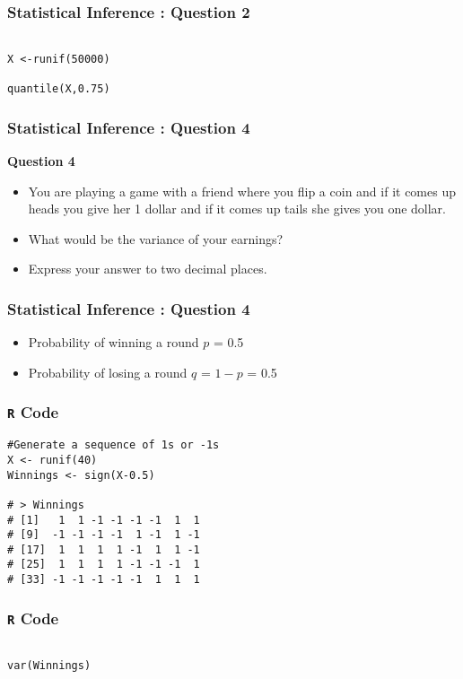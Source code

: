 \documentclass{beamer}
\begin{document}
\begin{frame}[fragile]
\frametitle{Statistical Inference : Question 2}

\begin{framed}
\begin{verbatim}

X <-runif(50000)

quantile(X,0.75)
\end{verbatim}
\end{framed}
\end{frame}
\begin{frame}
\frametitle{Statistical Inference : Question 4}
\Large
\textbf{Question 4}
\begin{itemize}
\item 
You are playing a game with a friend where you flip a coin and if it comes up heads you give her 1 dollar and 
if it comes up tails she gives you one dollar. 

\item What would be the variance of your earnings?

\item 
Express your answer to two decimal places.
\end{itemize}
\end{frame}
\begin{frame}
\frametitle{Statistical Inference : Question 4}
\Large
\vspace{-2cm}

\begin{itemize}
\item Probability of winning a round $p$ = 0.5
\bigskip
\item  Probability of losing a round $q$ = $1-p$ = 0.5


\end{itemize}
\end{frame}
\begin{frame}[fragile]
\frametitle{\texttt{R} Code}
\Large
\begin{verbatim}
#Generate a sequence of 1s or -1s
X <- runif(40)
Winnings <- sign(X-0.5)

# > Winnings
# [1]   1  1 -1 -1 -1 -1  1  1
# [9]  -1 -1 -1 -1  1 -1  1 -1
# [17]  1  1  1  1 -1  1  1 -1
# [25]  1  1  1  1 -1 -1 -1  1
# [33] -1 -1 -1 -1 -1  1  1  1

\end{verbatim}
\end{frame}
\begin{frame}[fragile]
\frametitle{\texttt{R} Code}
\Large
\begin{verbatim}

var(Winnings)


\end{verbatim}
\end{frame}
\end{document}
